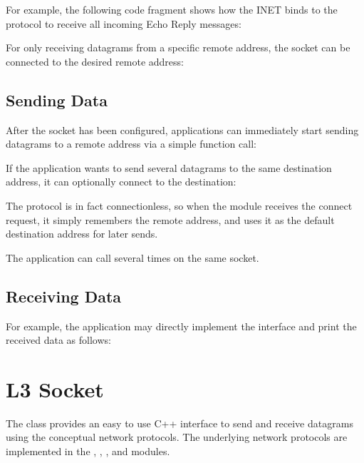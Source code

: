 For example, the following code fragment shows how the INET 
binds to the  protocol to receive all incoming
 Echo Reply messages:


For only receiving  datagrams from a specific remote address, the
socket can be connected to the desired remote address:


\subsection*{Sending Data}

After the socket has been configured, applications can immediately start sending
 datagrams to a remote address via a simple function call:


If the application wants to send several  datagrams to the same
destination address, it can optionally connect to the destination:


The  protocol is in fact connectionless, so when the
 module receives the connect request, it simply remembers the
remote address, and uses it as the default destination address for later sends.

The application can call  several times on the same socket.

\subsection*{Receiving Data}

For example, the application may directly implement the
 interface and print the received data as
follows:


\section{L3 Socket}
\label{sec:sockets:l3-socket}

The  class provides an easy to use C++ interface to send and
receive datagrams using the conceptual network protocols. The underlying network
protocols are implemented in the ,
, , and
 modules.

